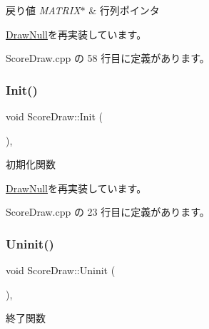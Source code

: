 \begin{DoxyRetVals}{戻り値}
{\em M\+A\+T\+R\+I\+X$\ast$} & 行列ポインタ \\
\hline
\end{DoxyRetVals}


\mbox{\hyperlink{class_draw_null_a9aac059eb3b5d1f77e8bd3aa0647cff9}{Draw\+Null}}を再実装しています。



 Score\+Draw.\+cpp の 58 行目に定義があります。

\mbox{\label{class_score_draw_af013abb96136825e71d4fee06529fc69}} 
\subsubsection{\texorpdfstring{Init()}{Init()}}
{\footnotesize\ttfamily void Score\+Draw\+::\+Init (\begin{DoxyParamCaption}{ }\end{DoxyParamCaption})\hspace{0.3cm}{\ttfamily [override]}, {\ttfamily [virtual]}}



初期化関数 



\mbox{\hyperlink{class_draw_null_a20aef1e54c1a158b741bfd731e18efdf}{Draw\+Null}}を再実装しています。



 Score\+Draw.\+cpp の 23 行目に定義があります。

\mbox{\label{class_score_draw_aad744f8a7a1202e6ba8117c660f297ee}} 
\subsubsection{\texorpdfstring{Uninit()}{Uninit()}}
{\footnotesize\ttfamily void Score\+Draw\+::\+Uninit (\begin{DoxyParamCaption}{ }\end{DoxyParamCaption})\hspace{0.3cm}{\ttfamily [override]}, {\ttfamily [virtual]}}



終了関数 



